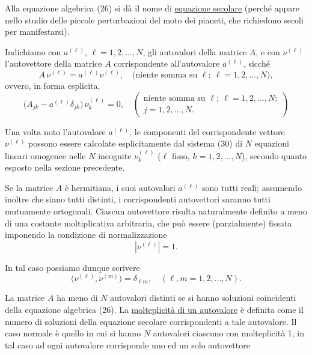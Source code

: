 \documentclass[11pt, a4paper]{book}
\numberwithin{equation}{section}
\begin{document}
Alla equazione algebrica (26) si dà il nome di \underline{equazione
secolare} (perché appare nello studio delle piccole perturbazioni del moto
dei pianeti, che richiedono secoli per manifestarsi).

Indichiamo con $a^{(\ell)}$, $\ell = 1, 2, \ldots, N$, gli autovalori
della matrice $A$, e con $\nu^{(\ell)}$ l'autovettore della matrice $A$
corrispondente all'autovalore $a^{(\ell)}$, sicché
\begin{equation}
A\,\nu^{(\ell)} = a^{(\ell)}\nu^{(\ell)},
\quad \text{(niente somma su } \ell;\ \ell=1,2,\ldots,N\text{)},
\tag{30a}
\end{equation}
ovvero, in forma esplicita,
\begin{equation}
\bigl(A_{jk} - a^{(\ell)}\delta_{jk}\bigr)\,\nu_k^{(\ell)} = 0,
\quad \begin{pmatrix}\text{niente somma su } \ell;\ \ell=1,2,\ldots,N;\\
j=1,2,\ldots,N.\end{pmatrix}
\tag{30b}
\end{equation}

Una volta noto l'autovalore $a^{(\ell)}$, le componenti del corrispondente
vettore $\nu^{(\ell)}$ possono essere calcolate esplicitamente dal sistema
(30) di $N$ equazioni lineari omogenee nelle $N$ incognite $\nu_k^{(\ell)}$
($\ell$ fisso, $k = 1,2,\ldots,N$), secondo quanto esposto nella sezione
precedente.

Se la matrice $A$ è hermitiana, i suoi autovalori $a^{(\ell)}$ sono tutti
reali; assumendo inoltre che siano tutti distinti, i corrispondenti
autovettori saranno tutti mutuamente ortogonali. Ciascun autovettore
risulta naturalmente definito a meno di una costante moltiplicativa
arbitraria, che può essere (parzialmente) fissata imponendo la condizione
di normalizzazione
\begin{equation}
\left|\nu^{(\ell)}\right| = 1.
\end{equation}

In tal caso possiamo dunque scrivere
\begin{equation}
\bigl(\nu^{(\ell)}, \nu^{(m)}\bigr) = \delta_{\ell m},
\quad (\ell, m = 1, 2, \ldots, N).
\end{equation}

La matrice $A$ ha meno di $N$ autovalori distinti se si hanno soluzioni
coincidenti della equazione algebrica (26). La \underline{molteplicità di
un autovalore} è definita come il numero di soluzioni della equazione
secolare corrispondenti a tale autovalore. Il caso normale è quello in cui
si hanno $N$ autovalori ciascuno con molteplicità 1; in tal caso ad ogni
autovalore corrisponde uno ed un solo autovettore
\end{document}
